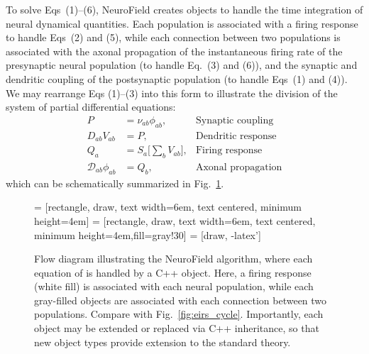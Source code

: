 \documentclass[preprint,review,10pt,authoryear,letterpaper]{elsarticle}
\begin{document}
To solve Eqs~(1)--(6), NeuroField creates objects to handle the time integration of neural dynamical quantities. Each population is associated with a firing response to handle Eqs~(2) and (5), while each connection between two populations is associated with the axonal propagation of the instantaneous firing rate of the presynaptic neural population (to handle Eq.~(3) and (6)), and the synaptic and dendritic coupling of the postsynaptic population (to handle Eqs~(1) and (4)). We may rearrange Eqs (1)--(3) into this form to illustrate the division of the system of partial differential equations:
\begin{align}
	P &= \nu_{ab}\phi_{ab}, & \text{Synaptic coupling}\\
	D_{ab}V_{ab} &= P, & \text{Dendritic response}\\
	Q_a &= S_a \big[\sum_b V_{ab} \big], & \text{Firing response}\\
	\mathcal{D}_{ab}\phi_{ab} &= Q_b,&  \text{Axonal propagation}
\end{align}
which can be schematically summarized in Fig.~\ref{fig:components}.

\begin{figure}
\begin{center}
 = [rectangle, draw, text width=6em, text centered, minimum height=4em]
 = [rectangle, draw, text width=6em, text centered, minimum height=4em,fill=gray!30]
 = [draw, -latex']    
\caption{Flow diagram illustrating the NeuroField algorithm, where each equation of \citet{Robinson2005} is handled by a C++ object. Here, a firing response (white fill) is associated with each neural population, while each gray-filled objects are associated with each connection between two populations. Compare with Fig.~\ref{fig:eirs_cycle}. Importantly, each object may be extended or replaced via C++ inheritance, so that new object types provide extension to the standard \citet{Robinson2005} theory.}
\label{fig:components}
\end{center}
\end{figure}
\end{document}
